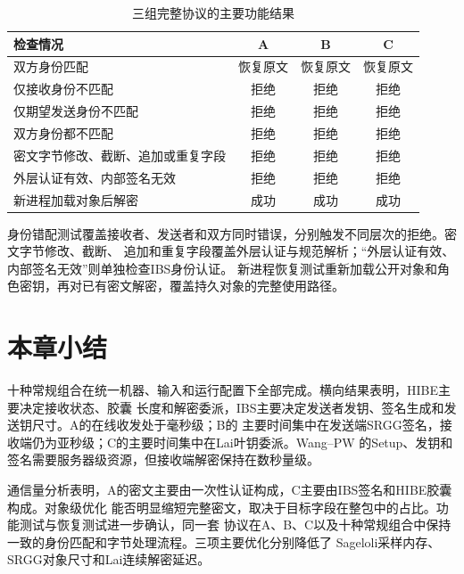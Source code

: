 \begin{table}[H]
\centering\small
\caption{三组完整协议的主要功能结果}
\label{tab:functional}
\begin{tabularx}{\textwidth}{@{}Xccc@{}}
\toprule
\rowcolor{black!8} 检查情况 & A & B & C \\
\midrule
双方身份匹配 & 恢复原文 & 恢复原文 & 恢复原文 \\
仅接收身份不匹配 & 拒绝 & 拒绝 & 拒绝 \\
仅期望发送身份不匹配 & 拒绝 & 拒绝 & 拒绝 \\
双方身份都不匹配 & 拒绝 & 拒绝 & 拒绝 \\
密文字节修改、截断、追加或重复字段 & 拒绝 & 拒绝 & 拒绝 \\
外层认证有效、内部签名无效 & 拒绝 & 拒绝 & 拒绝 \\
新进程加载对象后解密 & 成功 & 成功 & 成功 \\
\bottomrule
\end{tabularx}
\end{table}

身份错配测试覆盖接收者、发送者和双方同时错误，分别触发不同层次的拒绝。密文字节修改、截断、
追加和重复字段覆盖外层认证与规范解析；“外层认证有效、内部签名无效”则单独检查IBS身份认证。
新进程恢复测试重新加载公开对象和角色密钥，再对已有密文解密，覆盖持久对象的完整使用路径。

\section{本章小结}

十种常规组合在统一机器、输入和运行配置下全部完成。横向结果表明，HIBE主要决定接收状态、胶囊
长度和解密委派，IBS主要决定发送者发钥、签名生成和发送钥尺寸。A的在线收发处于毫秒级；B的
主要时间集中在发送端SRGG签名，接收端仍为亚秒级；C的主要时间集中在Lai叶钥委派。Wang--PW
的Setup、发钥和签名需要服务器级资源，但接收端解密保持在数秒量级。

通信量分析表明，A的密文主要由一次性认证构成，C主要由IBS签名和HIBE胶囊构成。对象级优化
能否明显缩短完整密文，取决于目标字段在整包中的占比。功能测试与恢复测试进一步确认，同一套
协议在A、B、C以及十种常规组合中保持一致的身份匹配和字节处理流程。三项主要优化分别降低了
Sageloli采样内存、SRGG对象尺寸和Lai连续解密延迟。
